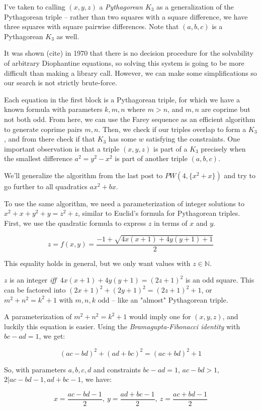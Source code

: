 \documentclass[a4paper]{amsproc}
\theoremstyle{plain}
\newcommand{\N} {\mathbb{N}}
\begin{document}
I've taken to calling $(x,y,z)$ a \textit{Pythagorean $K_3$} as a generalization of the Pythagorean triple --
rather than two squares with a square difference, we have three squares with square pairwise differences.
Note that $(a,b,c)$ is a Pythagorean $K_3$ as well.

It was shown (cite) in 1970 that there is no decision procedure for the solvability of arbitrary Diophantine equations, so solving this system is going to be more difficult than making a library call.
However, we can make some simplifications so our search is not strictly brute-force.

Each equation in the first block is a Pythagorean triple, for which we have a known formula with parameters $k,m,n$ where $m > n$, and $m,n$ are coprime but not both odd.
From here, we can use the Farey sequence as an efficient algorithm to generate coprime pairs $m,n$.
Then, we check if our triples overlap to form a $K_3$, and from there check if that $K_3$ has some $w$ satisfying the constraints.
One important observation is that a triple $(x,y,z)$ is part of a $K_3$ precisely when the smallest difference $a^2 = y^2 - x^2$ is part of another
triple $(a,b,c)$.

We'll generalize the algorithm from the last post to $PW(4, \{x^2+x\})$ and try to go further to all quadratics $ax^2+bx$.

To use the same algorithm, we need a parameterization of integer solutions to $x^2+x + y^2+y = z^2+z$,
similar to Euclid's formula for Pythagorean triples.
First, we use the quadratic formula to express $z$ in terms of $x$ and $y$.

$$z = f(x,y) = \frac{-1+\sqrt{4x(x+1)+4y(y+1)+1}}{2}$$

This equality holds in general, but we only want values with $z\in\N$.

$z$ is an integer \textit{iff} $\ 4x(x+1)+4y(y+1)=(2z+1)^2$ is an odd square.
This can be factored into $(2x+1)^2+(2y+1)^2=(2z+1)^2+1$, or $m^2+n^2=k^2+1$ with $m,n,k$ odd --
like an "almost" Pythagorean triple.

A parameterization of $m^2+n^2=k^2+1$ would imply one for $(x,y,z)$, and luckily this equation is easier.
Using the \textit{Bramagupta-Fibonacci identity} with $bc-ad=1$, we get:

$$(ac-bd)^2 + (ad+bc)^2 = (ac+bd)^2 + 1$$

So, with parameters $a,b,c,d$ and constraints $bc-ad=1$, $ac-bd> 1$, $2\vert ac-bd-1, ad+bc-1$, we have:

$$x = \frac{ac-bd-1}{2},\ y = \frac{ad+bc-1}{2},\ z = \frac{ac+bd-1}{2}$$
\end{document}
